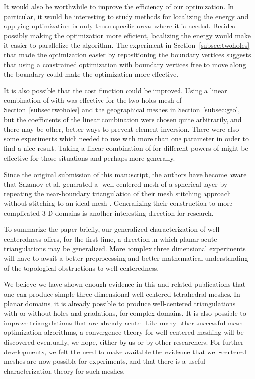 \documentclass[final]{siamltex}
\begin{document}
It would also be worthwhile to improve the efficiency of
our optimization.  In particular, it would be interesting
to study methods for localizing the energy and applying
optimization in only those specific areas where
it is needed. Besides possibly making the optimization
more efficient, localizing the energy would make it
easier to parallelize the algorithm.  The experiment
in Section~\ref{subsec:twoholes} that made the optimization easier
by repositioning the boundary vertices suggests that
using a constrained optimization with boundary
vertices free to move along the boundary could make the
optimization more effective.

It is also possible that the cost function could be improved.  Using a
linear combination of  with  was effective for
the two holes mesh of Section~\ref{subsec:twoholes} and
the geographical meshes in Section~\ref{subsec:geo},
but the coefficients of the linear combination
were chosen quite arbitrarily, and there may be other, better ways to
prevent element inversion.  There were also some experiments which
needed to use  with more than one parameter  in order to
find a nice result.  Taking a linear combination of  for
different powers of  might be effective for those situations and
perhaps more generally.


Since the original submission of this
manuscript, the authors have become aware
that Sazanov et al. generated a -well-centered mesh
of a spherical layer by repeating the near-boundary triangulation
of their mesh stitching approach without stitching to an ideal
mesh \cite{SaHaMoWe2007}.  Generalizing their construction
to more complicated 3-D domains is another interesting direction
for research.

To summarize the paper briefly,
our generalized characterization of well-cen\-tered\-ness
offers, for the first time, a direction in which planar acute
triangulations may be generalized. More complex three dimensional
experiments will have to await a better preprocessing and better
mathematical understanding of the topological obstructions to
well-centeredness.

We believe we have shown enough evidence in this and related
publications that one can produce simple three dimensional
well-centered tetrahedral meshes. In planar domains, it is already
possible to produce well-centered triangulations with or without holes
and gradations, for complex domains. It is
also possible to improve triangulations
that are already acute. Like many other
successful mesh optimization algorithms, a convergence theory for
well-centered meshing will be discovered eventually, we hope, either
by us or by other researchers. For further developments, we felt the
need to make available the evidence that well-centered meshes are now
possible for experiments, and that there is a useful characterization
theory for such meshes.
\end{document}
